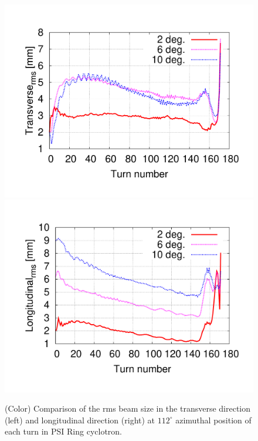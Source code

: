 \documentclass[aps,prstab,twocolumn,superscriptaddress,showpacs]{revtex4}
\begin{document}
\begin{figure}
  \includegraphics[width=0.45\linewidth]{figures/Comp-Transverse.pdf}
  \includegraphics[width=0.45\linewidth]{figures/Comp-Longitudinal.pdf}
  \caption{(Color) Comparison of the rms beam size in the transverse direction (left) and longitudinal direction (right) at $112^\circ$ azimuthal position of each turn 
    in PSI Ring cyclotron. }
  \label{fig:RMSsize}
\end{figure}
\end{document}
